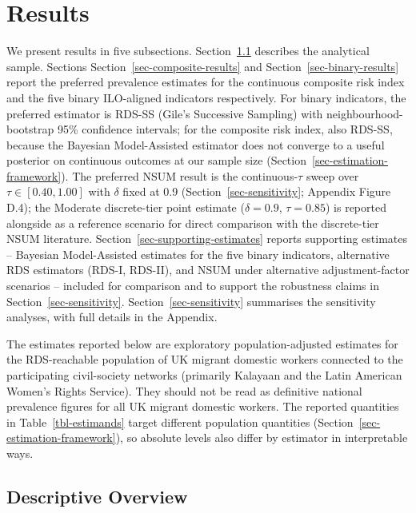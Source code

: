 \documentclass[
  12pt,
  letterpaper,
  DIV=11,
  numbers=noendperiod]{scrartcl}
\begin{document}
\section{Results}\label{sec-results}

We present results in five subsections. Section~\ref{sec-descriptive}
describes the analytical sample. Sections
Section~\ref{sec-composite-results} and Section~\ref{sec-binary-results}
report the preferred prevalence estimates for the continuous composite
risk index and the five binary ILO-aligned indicators respectively. For
binary indicators, the preferred estimator is RDS-SS (Gile's Successive
Sampling) with neighbourhood-bootstrap 95\% confidence intervals; for
the composite risk index, also RDS-SS, because the Bayesian
Model-Assisted estimator does not converge to a useful posterior on
continuous outcomes at our sample size
(Section~\ref{sec-estimation-framework}). The preferred NSUM result is
the continuous-\(\tau\) sweep over \(\tau \in [0.40, 1.00]\) with
\(\delta\) fixed at 0.9 (Section~\ref{sec-sensitivity}; Appendix Figure
D.4); the Moderate discrete-tier point estimate (\(\delta = 0.9\),
\(\tau = 0.85\)) is reported alongside as a reference scenario for
direct comparison with the discrete-tier NSUM literature.
Section~\ref{sec-supporting-estimates} reports supporting estimates --
Bayesian Model-Assisted estimates for the five binary indicators,
alternative RDS estimators (RDS-I, RDS-II), and NSUM under alternative
adjustment-factor scenarios -- included for comparison and to support
the robustness claims in Section~\ref{sec-sensitivity}.
Section~\ref{sec-sensitivity} summarises the sensitivity analyses, with
full details in the Appendix.

The estimates reported below are exploratory population-adjusted
estimates for the RDS-reachable population of UK migrant domestic
workers connected to the participating civil-society networks (primarily
Kalayaan and the Latin American Women's Rights Service). They should not
be read as definitive national prevalence figures for all UK migrant
domestic workers. The reported quantities in Table~\ref{tbl-estimands}
target different population quantities
(Section~\ref{sec-estimation-framework}), so absolute levels also differ
by estimator in interpretable ways.

\subsection{Descriptive Overview}\label{sec-descriptive}
\end{document}

